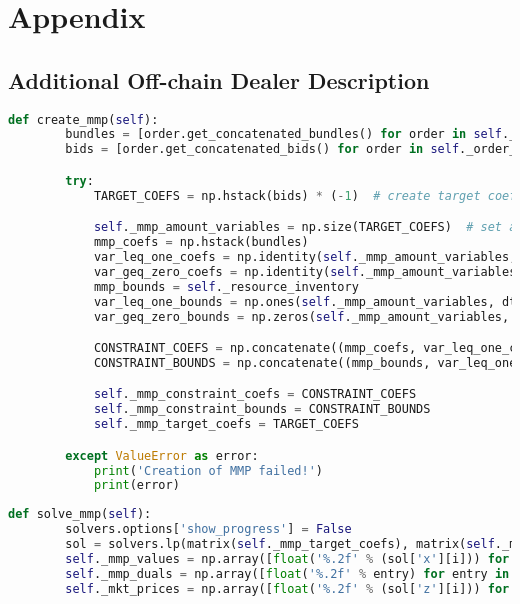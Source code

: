 \section{Appendix}

\subsection{Additional Off-chain Dealer Description}
\label{appendix:additional_offchain}

\begin{lstlisting}[float=htbp, label=lst:creation_mmp, caption=Creation of MMP, language=Python]
    def create_mmp(self):
        bundles = [order.get_concatenated_bundles() for order in self._order_handler.get_all_orders()]
        bids = [order.get_concatenated_bids() for order in self._order_handler.get_all_orders()]

        try:
            TARGET_COEFS = np.hstack(bids) * (-1)  # create target coef vector

            self._mmp_amount_variables = np.size(TARGET_COEFS)  # set amount of variables
            mmp_coefs = np.hstack(bundles)
            var_leq_one_coefs = np.identity(self._mmp_amount_variables, dtype=float)  # create constraint matrix for y<=1
            var_geq_zero_coefs = np.identity(self._mmp_amount_variables, dtype=float) * (-1)  # create constraint matrix for y>=0
            mmp_bounds = self._resource_inventory
            var_leq_one_bounds = np.ones(self._mmp_amount_variables, dtype=float)
            var_geq_zero_bounds = np.zeros(self._mmp_amount_variables, dtype=float)

            CONSTRAINT_COEFS = np.concatenate((mmp_coefs, var_leq_one_coefs, var_geq_zero_coefs), axis=0)  # create final constraint matrix
            CONSTRAINT_BOUNDS = np.concatenate((mmp_bounds, var_leq_one_bounds, var_geq_zero_bounds))  # create final bounds matrix

            self._mmp_constraint_coefs = CONSTRAINT_COEFS
            self._mmp_constraint_bounds = CONSTRAINT_BOUNDS
            self._mmp_target_coefs = TARGET_COEFS

        except ValueError as error:
            print('Creation of MMP failed!')
            print(error)
\end{lstlisting}

\begin{lstlisting}[float=htbp, label=lst:solving_mmp, caption=Solving of MMP, language=Python]
    def solve_mmp(self):
        solvers.options['show_progress'] = False
        sol = solvers.lp(matrix(self._mmp_target_coefs), matrix(self._mmp_constraint_coefs), matrix(self._mmp_constraint_bounds))
        self._mmp_values = np.array([float('%.2f' % (sol['x'][i])) for i in range(self._mmp_amount_variables)])
        self._mmp_duals = np.array([float('%.2f' % entry) for entry in sol['z']])
        self._mkt_prices = np.array([float('%.2f' % (sol['z'][i])) for i in range(self._shared_resource_size)])
\end{lstlisting}